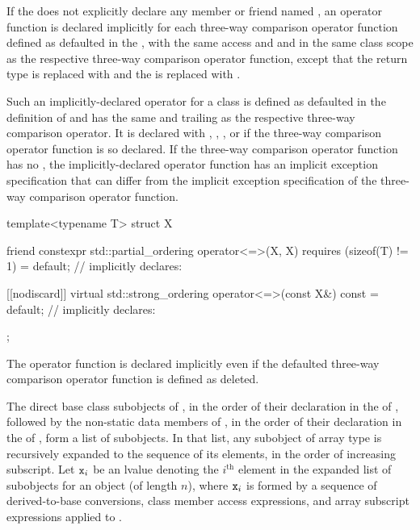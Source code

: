 \pnum
If the 
does not explicitly declare
any member or friend named ,
an \tcode{==} operator function is declared implicitly
for each three-way comparison operator function
defined as defaulted in the ,
with the same access and  and
in the same class scope as
the respective three-way comparison operator function,
except that the return type is replaced with  and
the  is replaced with .
\begin{note}
Such an implicitly-declared \tcode{==} operator for a class 
is defined as defaulted
in the definition of  and
has the same  and
trailing  as
the respective three-way comparison operator.
It is declared with , , ,
or  if
the three-way comparison operator function is so declared.
If the three-way comparison operator function
has no ,
the implicitly-declared \tcode{==} operator function
has an implicit exception specification that
can differ from the implicit exception specification of
the three-way comparison operator function.
\end{note}
\begin{example}
\begin{codeblock}
template<typename T> struct X {
  friend constexpr std::partial_ordering operator<=>(X, X) requires (sizeof(T) != 1) = default;
  // implicitly declares: 

  [[nodiscard]] virtual std::strong_ordering operator<=>(const X&) const = default;
  // implicitly declares: 
};
\end{codeblock}
\end{example}
\begin{note}
The \tcode{==} operator function is declared implicitly even if
the defaulted three-way comparison operator function
is defined as deleted.
\end{note}

\pnum
The direct base class subobjects of ,
in the order of their declaration in the  of ,
followed by the non-static data members of ,
in the order of their declaration in the  of ,
form a list of subobjects.
In that list, any subobject of array type is recursively expanded
to the sequence of its elements, in the order of increasing subscript.
Let $\texttt{x}_i$ be an lvalue denoting the $i^\text{th}$ element
in the expanded list of subobjects for an object 
(of length $n$),
where $\texttt{x}_i$ is
formed by a sequence of
derived-to-base conversions,
class member access expressions, and
array subscript expressions applied to .

